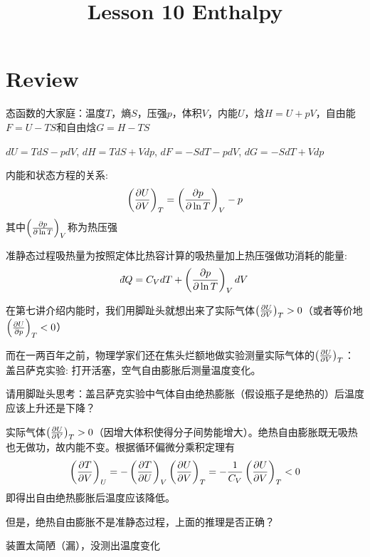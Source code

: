 \documentclass[CJK]{beamer}
\title{Lesson 10 Enthalpy}
\author{}
\date{}
\begin{document}

\section{Review}

\begin{frame}
\bch 
\bitem
\item{态函数的大家庭：温度$T$，熵$S$，压强$p$，体积$V$，内能$U$，焓$H=U+pV$，自由能$F=U-TS$和自由焓$G=H-TS$}
\item{$dU = TdS - pdV$, $dH = TdS + Vdp$, $dF = -SdT - pdV$, $dG = -SdT + Vdp$}
\item{内能和状态方程的关系:
 $$\left(\frac{\partial U}{\partial V}\right)_{T} = \left(\frac{\partial p}{\partial \ln T}\right)_{V} - p $$
其中$\left(\frac{\partial p}{\partial \ln T}\right)_{V}$称为热压强}
\item{准静态过程吸热量为按照定体比热容计算的吸热量加上热压强做功消耗的能量:
$$ \dbar Q = C_V dT + \pfrac p{\ln T}V dV$$}
\eitem
\ech
\end{frame}

\begin{frame}
\bch
在第七讲介绍内能时，我们用脚趾头就想出来了实际气体$\left(\frac{\partial U}{\partial V}\right)_{T} > 0$（或者等价地$\left(\frac{\partial U}{\partial p}\right)_{T} < 0$）

而在一两百年之前，物理学家们还在焦头烂额地做实验测量实际气体的$\left(\frac{\partial U}{\partial V}\right)_{T} $：
盖吕萨克实验: 打开活塞，空气自由膨胀后测量温度变化。
\emini
{}
\emini

\ech
\end{frame}


\begin{frame}
\bch
{}
请用脚趾头思考：盖吕萨克实验中气体自由绝热膨胀（假设瓶子是绝热的）后温度应该上升还是下降？
\ech
\end{frame}


\begin{frame}
\bch
{}

实际气体$\left(\frac{\partial U}{\partial V}\right)_{T}>0$（因增大体积使得分子间势能增大）。绝热自由膨胀既无吸热也无做功，故内能不变。根据循环偏微分乘积定理有
$$\left(\frac{\partial T}{\partial V}\right)_{U} = -\left(\frac{\partial T}{\partial U}\right)_{V} \left(\frac{\partial U}{\partial V}\right)_{T} = -\frac{1}{C_V} \left(\frac{\partial U}{\partial V}\right)_{T} < 0$$
即得出自由绝热膨胀后温度应该降低。

\skipline

但是，绝热自由膨胀不是准静态过程，上面的推理是否正确？

\ech
\end{frame}


\begin{frame}
\bch


装置太简陋（漏），没测出温度变化 
\ech
\end{frame}
\end{document}
